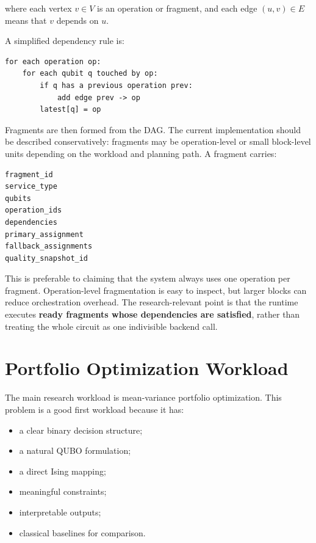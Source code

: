 \documentclass[11pt]{article}
\begin{document}
where each vertex \(v\in V\) is an operation or fragment, and each edge \((u,v)\in E\) means that \(v\) depends on \(u\).

A simplified dependency rule is:

\begin{lstlisting}[style=codestyle,caption={Workflow sketch.}]
for each operation op:
    for each qubit q touched by op:
        if q has a previous operation prev:
            add edge prev -> op
        latest[q] = op
\end{lstlisting}

Fragments are then formed from the DAG. The current implementation should be described conservatively: fragments may be operation-level or small block-level units depending on the workload and planning path. A fragment carries:

\begin{lstlisting}[style=codestyle,caption={Workflow sketch.}]
fragment_id
service_type
qubits
operation_ids
dependencies
primary_assignment
fallback_assignments
quality_snapshot_id
\end{lstlisting}

This is preferable to claiming that the system always uses one operation per fragment. Operation-level fragmentation is easy to inspect, but larger blocks can reduce orchestration overhead. The research-relevant point is that the runtime executes \textbf{ready fragments whose dependencies are satisfied}, rather than treating the whole circuit as one indivisible backend call.

\section{Portfolio Optimization Workload}

The main research workload is mean-variance portfolio optimization. This problem is a good first workload because it has:

\begin{itemize}
\item a clear binary decision structure;
\item a natural QUBO formulation;
\item a direct Ising mapping;
\item meaningful constraints;
\item interpretable outputs;
\item classical baselines for comparison.
\end{itemize}
\end{document}
